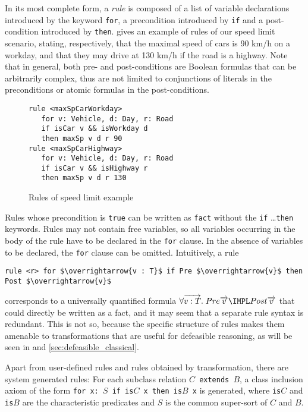 In its most complete form, a \emph{rule} is composed of a list of variable
declarations introduced by the keyword \texttt{for}, a precondition introduced
by \texttt{if} and a post-condition introduced by
\texttt{then}.  gives an example of rules of our speed limit
scenario, stating, respectively, that the maximal speed of cars is 90 km/h on a
workday,
and that they may drive at 130 km/h if the road is a highway.  Note that in
general, both pre- and post-conditions are Boolean formulas that can be
arbitrarily complex, thus are not limited to conjunctions of literals in the
preconditions or atomic formulas in the post-conditions.

\begin{figure}[h!]
  \begin{lstlisting}
rule <maxSpCarWorkday> 
   for v: Vehicle, d: Day, r: Road
   if isCar v && isWorkday d
   then maxSp v d r 90
rule <maxSpCarHighway>
   for v: Vehicle, d: Day, r: Road
   if isCar v && isHighway r
   then maxSp v d r 130
\end{lstlisting}
  \caption{Rules of speed limit example}\label{fig:rules}
\end{figure}

Rules whose precondition is \texttt{true} can be written as \texttt{fact}
without the \texttt{if} \dots \texttt{then} keywords.
Rules may not contain free variables, so all variables occurring in the body of
the rule have to be declared in the \texttt{for} clause. In the absence of
variables to be declared, the \texttt{for} clause can be omitted. 
Intuitively, a rule
\begin{lstlisting}[frame=none,mathescape=true]
  rule <r> for $\overrightarrow{v : T}$ if Pre $\overrightarrow{v}$ then Post $\overrightarrow{v}$
\end{lstlisting}
corresponds to a universally quantified formula
$\forall \overrightarrow{v : T}.\; Pre \overrightarrow{v}
\IMPL Post \overrightarrow{v}$ that could directly be written as a fact,
and it may seem that a separate rule syntax is redundant. This is not so,
because the specific structure of rules makes them amenable to transformations
that are useful for defeasible reasoning, as will be seen in
 and \ref{sec:defeasible_classical}.

Apart from user-defined rules and rules obtained by transformation, there are
system generated rules: For each subclass relation \texttt{$C$ extends $B$}, a
class inclusion axiom of the form \texttt{for x: $S$ if is$C$ x then is$B$ x}
is generated, where \texttt{is$C$} and \texttt{is$B$} are the characteristic
predicates and $S$ is the common super-sort of $C$ and $B$.

